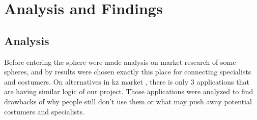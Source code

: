 \chapter{Analysis and Findings}\label{ch:B}

\section{Analysis}
Before entering the sphere were made analysis on market research of some spheres, and by results were chosen exactly this place for connecting specialists and costumers. On alternatives in kz market , there is only 3 applications that are having similar logic of our project. Those applications were analyzed to find drawbacks of why people still don’t use them or what may push away potential costumers and specialists.
